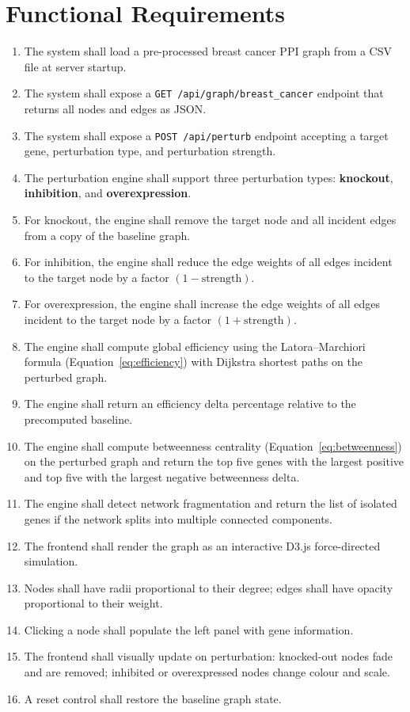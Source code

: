 \documentclass[12pt,a4paper]{report}
\begin{document}
\section{Functional Requirements}

\begin{enumerate}[label=FR\arabic*., leftmargin=3em]
  \item The system shall load a pre-processed breast cancer PPI graph from a CSV file at server startup.
  \item The system shall expose a \texttt{GET /api/graph/breast\_cancer} endpoint that returns all nodes and edges as JSON.
  \item The system shall expose a \texttt{POST /api/perturb} endpoint accepting a target gene, perturbation type, and perturbation strength.
  \item The perturbation engine shall support three perturbation types: \textbf{knockout}, \textbf{inhibition}, and \textbf{overexpression}.
  \item For knockout, the engine shall remove the target node and all incident edges from a copy of the baseline graph.
  \item For inhibition, the engine shall reduce the edge weights of all edges incident to the target node by a factor $(1 - \text{strength})$.
  \item For overexpression, the engine shall increase the edge weights of all edges incident to the target node by a factor $(1 + \text{strength})$.
  \item The engine shall compute global efficiency using the Latora--Marchiori formula (Equation~\ref{eq:efficiency}) with Dijkstra shortest paths on the perturbed graph.
  \item The engine shall return an efficiency delta percentage relative to the precomputed baseline.
  \item The engine shall compute betweenness centrality (Equation~\ref{eq:betweenness}) on the perturbed graph and return the top five genes with the largest positive and top five with the largest negative betweenness delta.
  \item The engine shall detect network fragmentation and return the list of isolated genes if the network splits into multiple connected components.
  \item The frontend shall render the graph as an interactive D3.js force-directed simulation.
  \item Nodes shall have radii proportional to their degree; edges shall have opacity proportional to their weight.
  \item Clicking a node shall populate the left panel with gene information.
  \item The frontend shall visually update on perturbation: knocked-out nodes fade and are removed; inhibited or overexpressed nodes change colour and scale.
  \item A reset control shall restore the baseline graph state.
\end{enumerate}
\end{document}
